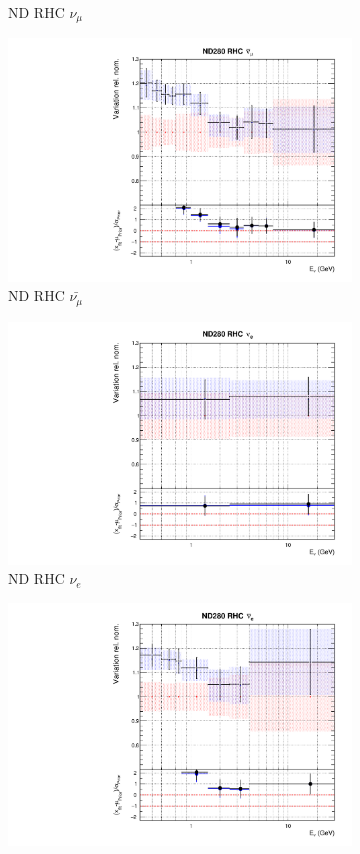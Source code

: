 \begin{figure}
\begin{subfigure}{0.24\textwidth}
  \caption{ND RHC $\nu_{\mu}$}
\end{subfigure}
\begin{subfigure}{0.24\textwidth}
  \centering
  \includegraphics[width=0.95\linewidth]{figs/fixed2p2hflux5}
  \caption{ND RHC $\bar{\nu_{\mu}}$}
\end{subfigure}
\begin{subfigure}{0.24\textwidth}
  \centering
  \includegraphics[width=0.95\linewidth]{figs/fixed2p2hflux6}
  \caption{ND RHC $\nu_{e}$}
\end{subfigure}
\vspace{15mm}
\begin{subfigure}{0.24\textwidth}
  \centering
  \includegraphics[width=0.95\linewidth]{figs/fixed2p2hflux7}

\end{subfigure}
\end{figure}
